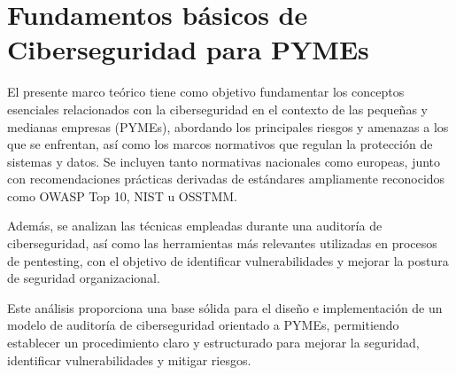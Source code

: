 \documentclass[a4paper, 10pt]{article}
\begin{document}
\clearpage































\section{Fundamentos básicos de Ciberseguridad para PYMEs}

El presente marco teórico tiene como objetivo fundamentar los conceptos esenciales relacionados con la ciberseguridad en el contexto de las pequeñas y medianas empresas (PYMEs), abordando los principales riesgos y amenazas a los que se enfrentan, así como los marcos normativos que regulan la protección de sistemas y datos. Se incluyen tanto normativas nacionales como europeas, junto con recomendaciones prácticas derivadas de estándares ampliamente reconocidos como OWASP Top 10, NIST u OSSTMM.

\par\vspace{0.5cm}

Además, se analizan las técnicas empleadas durante una auditoría de ciberseguridad, así como las herramientas más relevantes utilizadas en procesos de pentesting, con el objetivo de identificar vulnerabilidades y mejorar la postura de seguridad organizacional.
\par\vspace{0.5cm}

Este análisis proporciona una base sólida para el diseño e implementación de un modelo de auditoría de ciberseguridad orientado a PYMEs, permitiendo establecer un procedimiento claro y estructurado para mejorar la seguridad, identificar vulnerabilidades y mitigar riesgos.
\end{document}
